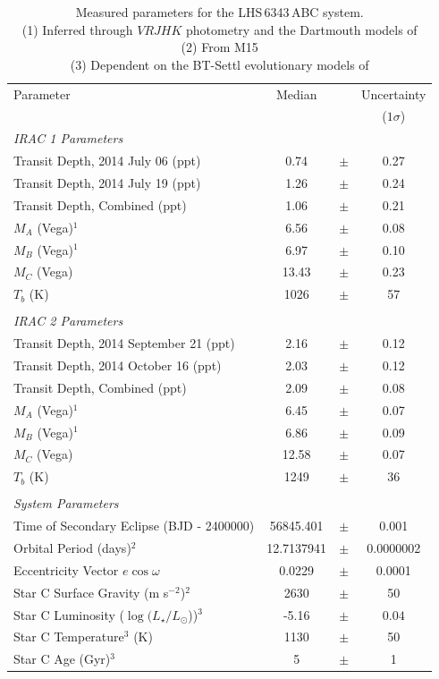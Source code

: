 \begin{table}[hbt!]
\centering
\begin{tabular}{lccc}
\hline
\footnotesize
Parameter & Median    & & Uncertainty \\
 & & & ($1\sigma$) \\
\hline
\textit{IRAC 1 Parameters}\\
Transit Depth, 2014 July 06 (ppt) & 0.74 & $\pm$ & 0.27 \\
Transit Depth, 2014 July 19 (ppt) & 1.26 & $\pm$ & 0.24 \\
Transit Depth, Combined (ppt) & 1.06 & $\pm$ & 0.21 \\
$M_A$ (Vega)$^1$ & 6.56  & $\pm$ & 0.08 \\
$M_B$ (Vega)$^1$ & 6.97 & $\pm$ & 0.10 \\
$M_C$ (Vega)& 13.43 & $\pm$ & 0.23 \\
$T_b$ (K) & 1026 & $\pm$ & 57 \\
\\
\textit{IRAC 2 Parameters}\\
Transit Depth, 2014 September 21 (ppt) & 2.16 &$\pm$  & 0.12 \\
Transit Depth, 2014 October 16 (ppt) & 2.03 & $\pm$ & 0.12 \\
Transit Depth, Combined (ppt) & 2.09 & $\pm$ & 0.08 \\
$M_A$ (Vega)$^1$ & 6.45  & $\pm$ & 0.07 \\
$M_B$ (Vega)$^1$ & 6.86 & $\pm$ & 0.09 \\
$M_C$ (Vega) & 12.58 & $\pm$ & 0.07 \\
$T_b$ (K) & 1249 & $\pm$ & 36 \\
\\
\textit{System Parameters} \\
Time of Secondary Eclipse (BJD - 2400000) & 56845.401 & $\pm$ & 0.001 \\
Orbital Period (days)$^2$ &  12.7137941 & $\pm$ & 0.0000002 \\
Eccentricity Vector $e \cos \omega$ & 0.0229 & $\pm$ & 0.0001 \\
Star C Surface Gravity (m s$^{-2}$)$^2$ & 2630 & $\pm$ & 50  \\
Star C Luminosity ($\log(L_\star /L_\odot$))$^3$  & -5.16 & $\pm$  & $0.04$  \\
Star C Temperature$^3$ (K) & 1130 & $\pm$ & 50 \\
Star C Age (Gyr)$^3$ & 5 & $\pm$ & 1 \\
\hline
\end{tabular}
\caption[Measured parameters for the LHS\,6343\,ABC system]{Measured parameters for the LHS\,6343\,ABC system. \\
(1) Inferred through $VRJHK$ photometry and the Dartmouth models of \citet{Dotter08}  \\
(2) From M15 \\
(3) Dependent on the BT-Settl evolutionary models of \citet{Allard12}}
\label{tab:results}
\end{table}

